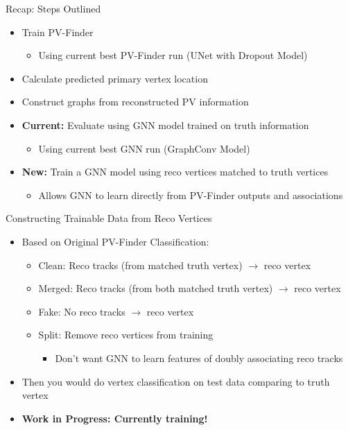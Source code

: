 \documentclass[xcolor=table,aspectratio=169]{beamer}
\begin{document}
\begin{frame}{Recap: Steps Outlined}
    \begin{itemize}
        \item Train PV-Finder
        \begin{itemize}
            \item Using current best PV-Finder run (UNet with Dropout Model)
        \end{itemize}
        \item Calculate predicted primary vertex location
        \item Construct graphs from reconstructed PV information
        \item \textbf{Current:} Evaluate using GNN model trained on truth information
        \begin{itemize}
            \item Using current best GNN run (GraphConv Model)
        \end{itemize}
        \item \textbf{New:} Train a GNN model using reco vertices matched to truth vertices
        \begin{itemize}
            \item Allows GNN to learn directly from PV-Finder outputs and associations
        \end{itemize}
    \end{itemize}
\end{frame}

\begin{frame}{Constructing Trainable Data from Reco Vertices}
    \begin{itemize}
        \item Based on Original PV-Finder Classification:
        \begin{itemize}
            \item Clean: Reco tracks (from matched truth vertex) \(\rightarrow\) reco vertex
            \item Merged: Reco tracks (from both matched truth vertex) \(\rightarrow\) reco vertex
            \item Fake: No reco tracks \(\rightarrow\) reco vertex
            \item Split: Remove reco vertices from training
            \begin{itemize}
                \item Don't want GNN to learn features of doubly associating reco tracks
            \end{itemize}
        \end{itemize}
        \item Then you would do vertex classification on test data comparing to truth vertex
        \item \textbf{Work in Progress: Currently training!}
    \end{itemize}
\end{frame}
\end{document}
